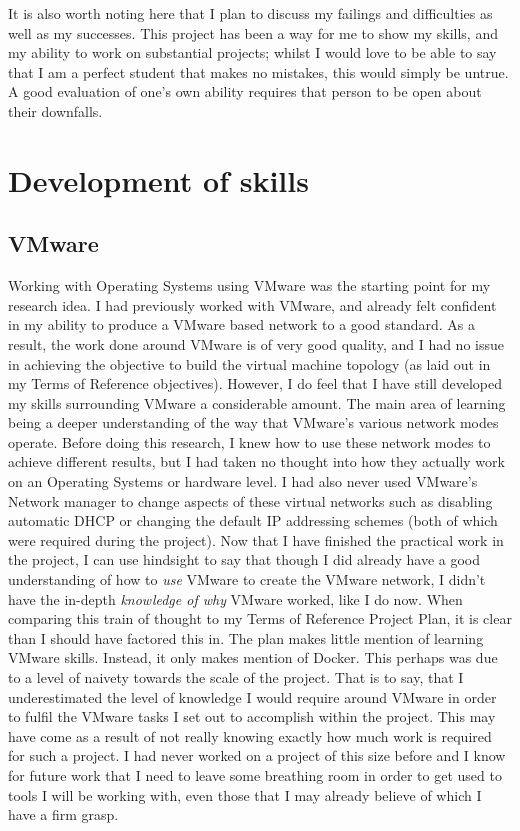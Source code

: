 It is also worth noting here that I plan to discuss my failings and difficulties as well as my successes. This project has been a way for me to show my skills, and my ability to work on substantial projects; whilst I would love to be able to say that I am a perfect student that makes no mistakes, this would simply be untrue. A good evaluation of one's own ability requires that person to be open about their downfalls.

\section{Development of skills}
\subsection{VMware}%
Working with Operating Systems using VMware was the starting point for my research idea. I had previously worked with VMware, and already felt confident in my ability to produce a VMware based network to a good standard. As a result, the work done around VMware is of very good quality, and I had no issue in achieving the objective to build the virtual machine topology (as laid out in my Terms of Reference objectives). However, I do feel that I have still developed my skills surrounding VMware a considerable amount. The main area of learning being a deeper understanding of the way that VMware's various network modes operate. Before doing this research, I knew how to use these network modes to achieve different results, but I had taken no thought into how they actually work on an Operating Systems or hardware level. I had also never used VMware's Network manager to change aspects of these virtual networks such as disabling automatic DHCP or changing the default IP addressing schemes (both of which were required during the project). Now that I have finished the practical work in the project, I can use hindsight to say that though I did already have a good understanding of how to \emph{use} VMware to create the VMware network, I didn't have the in-depth \emph{knowledge of why} VMware worked, like I do now. When comparing this train of thought to my Terms of Reference Project Plan, it is clear than I should have factored this in. The plan makes little mention of learning VMware skills. Instead, it only makes mention of Docker. This perhaps was due to a level of naivety towards the scale of the project. That is to say, that I underestimated the level of knowledge I would require around VMware in order to fulfil the VMware tasks I set out to accomplish within the project. This may have come as a result of not really knowing exactly how much work is required for such a project. I had never worked on a project of this size before and I know for future work that I need to leave some breathing room in order to get used to tools I will be working with, even those that I may already believe of which I have a firm grasp.

